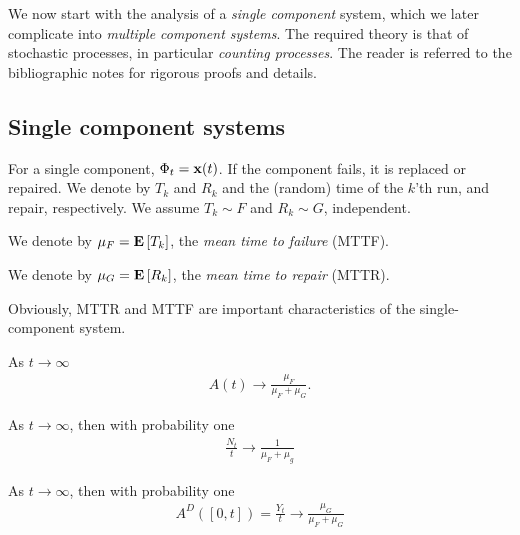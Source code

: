 We now start with the analysis of a \emph{single component} system, which we later complicate into \emph{multiple component systems}. 
The required theory is that of stochastic processes, in particular \emph{counting processes}. 
The reader is referred to the bibliographic notes for rigorous proofs and details. 

\subsection{Single component systems}
For a single component, $\Phi_t=\mathbf{x}(t)$. 
If the component fails, it is replaced or repaired. 
We denote by $T_k$ and $R_k$ and the (random) time of the $k$'th run, and repair, respectively.
We assume $T_k \sim F$ and $R_k \sim G$, independent.

\begin{definition}[MTTF]
We denote by $\mu_F=\mathbf{E}\left[ T_k \right]$, the \emph{mean time to failure} (MTTF).
\end{definition}


\begin{definition}[MTTR]
We denote by $\mu_G=\mathbf{E}\left[ R_k \right]$, the \emph{mean time to repair} (MTTR).
\end{definition}

Obviously, MTTR and MTTF are important characteristics of the single-component system.


\begin{theorem}
As $t \to \infty$
\begin{align}
	A(t) \to \frac{\mu_F}{\mu_F+\mu_G}.
\end{align}
\end{theorem}

\begin{theorem}

As $t \to \infty$, then with probability one
\begin{align}
	\frac{N_t}{t} \to \frac{1}{\mu_F+\mu_g}
\end{align}
\end{theorem}

\begin{theorem}
As $t \to \infty$, then with probability one
\begin{align}
	A^D([0,t])=\frac{Y_t}{t} \to \frac{\mu_G}{\mu_F+\mu_G} 
\end{align}
	
\end{theorem}








